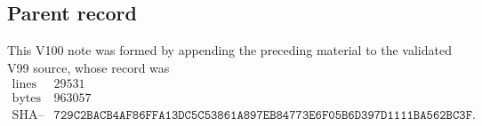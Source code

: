 \documentclass[11pt]{article}
\begin{document}
\subsection{Parent record}

This V100 note was formed by appending the preceding material to the
validated V99 source, whose record was
\[
\begin{array}{c|c}
\text{lines}&29531\\
\text{bytes}&963057\\
\text{SHA--256}&
\texttt{729C2BACB4AF86FFA13DC5C53861A897EB84773E6F05B6D397D1111BA562BC3F}.
\end{array}                                                    \tag{100.3}
\]

\end{document}
